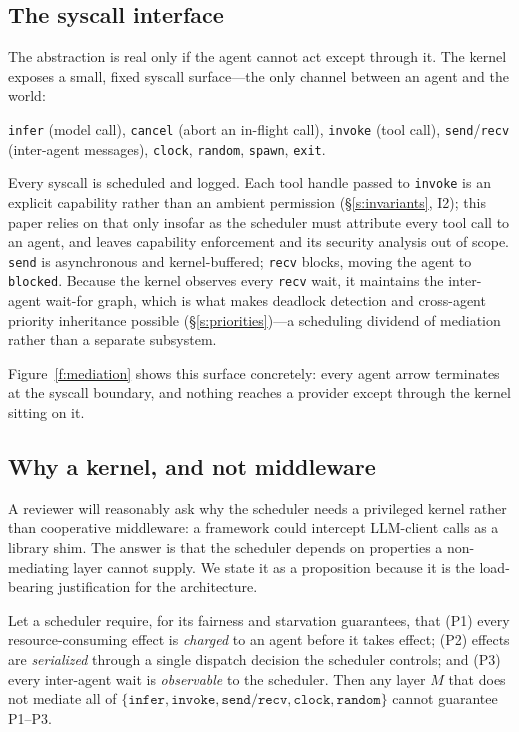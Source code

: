 \documentclass[letterpaper,11pt,leqno]{article}
\begin{document}
\subsection{The syscall interface}\label{s:syscall}

The abstraction is real only if the agent cannot act except through it. The kernel exposes a small, fixed syscall surface---the only channel between an agent and the world:

\texttt{infer} (model call), \texttt{cancel} (abort an in-flight call), \texttt{invoke} (tool call), \texttt{send}/\texttt{recv} (inter-agent messages), \texttt{clock}, \texttt{random}, \texttt{spawn}, \texttt{exit}.

Every syscall is scheduled and logged. Each tool handle passed to \texttt{invoke} is an explicit capability rather than an ambient permission (\S\ref{s:invariants}, I2); this paper relies on that only insofar as the scheduler must attribute every tool call to an agent, and leaves capability enforcement and its security analysis out of scope. \texttt{send} is asynchronous and kernel-buffered; \texttt{recv} blocks, moving the agent to \texttt{blocked}. Because the kernel observes every \texttt{recv} wait, it maintains the inter-agent wait-for graph, which is what makes deadlock detection and cross-agent priority inheritance possible (\S\ref{s:priorities})---a scheduling dividend of mediation rather than a separate subsystem.

Figure~\ref{f:mediation} shows this surface concretely: every agent arrow terminates at the syscall boundary, and nothing reaches a provider except through the kernel sitting on it.

\subsection{Why a kernel, and not middleware}\label{s:mediation}

A reviewer will reasonably ask why the scheduler needs a privileged kernel rather than cooperative middleware: a framework could intercept LLM-client calls as a library shim. The answer is that the scheduler depends on properties a non-mediating layer cannot supply. We state it as a proposition because it is the load-bearing justification for the architecture.

\begin{proposition}\label{p:mediation}
Let a scheduler require, for its fairness and starvation guarantees, that (P1) every resource-consuming effect is \emph{charged} to an agent before it takes effect; (P2) effects are \emph{serialized} through a single dispatch decision the scheduler controls; and (P3) every inter-agent wait is \emph{observable} to the scheduler. Then any layer $M$ that does not mediate all of $\{\texttt{infer}, \texttt{invoke}, \texttt{send}/\texttt{recv}, \texttt{clock}, \texttt{random}\}$ cannot guarantee P1--P3.
\end{proposition}
\end{document}
